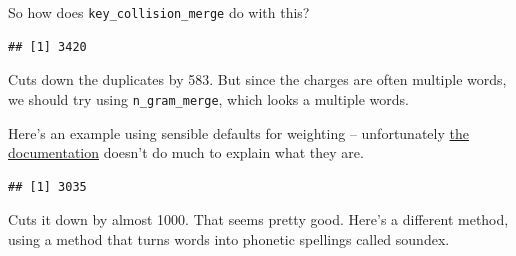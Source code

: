 \documentclass[]{book}
\newenvironment{Shaded}{\begin{snugshade}}{\end{snugshade}}
\newcommand{\DataTypeTok}[1]{\textcolor[rgb]{0.13,0.29,0.53}{#1}}
\newcommand{\DecValTok}[1]{\textcolor[rgb]{0.00,0.00,0.81}{#1}}
\newcommand{\FloatTok}[1]{\textcolor[rgb]{0.00,0.00,0.81}{#1}}
\newcommand{\KeywordTok}[1]{\textcolor[rgb]{0.13,0.29,0.53}{\textbf{#1}}}
\newcommand{\NormalTok}[1]{#1}
\newcommand{\OperatorTok}[1]{\textcolor[rgb]{0.81,0.36,0.00}{\textbf{#1}}}
\newcommand{\StringTok}[1]{\textcolor[rgb]{0.31,0.60,0.02}{#1}}
\begin{document}
So how does \texttt{key\_collision\_merge} do with this?

\begin{Shaded}
\end{Shaded}

\begin{verbatim}
## [1] 3420
\end{verbatim}

Cuts down the duplicates by 583. But since the charges are often multiple words, we should try using \texttt{n\_gram\_merge}, which looks a multiple words.

Here's an example using sensible defaults for weighting -- unfortunately \href{https://github.com/ChrisMuir/refinr}{the documentation} doesn't do much to explain what they are.

\begin{Shaded}
\end{Shaded}

\begin{verbatim}
## [1] 3035
\end{verbatim}

Cuts it down by almost 1000. That seems pretty good. Here's a different method, using a method that turns words into phonetic spellings called soundex.
\end{document}
